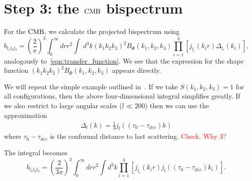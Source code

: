 \section{Step 3: the $\text{CMB}$ bispectrum}
    For the $\text{CMB}$, we calculate the projected bispectrum using~\cite{FergShell_2}
    \begin{equation}
    \label{eq:reduced_cmb}
    b_{l_1l_2l_3} = \left(\frac{2}{\pi}\right)^3\int_{0}^{\infty}drr^2
        \int~d^3k (k_1k_2k_3)^2 B_{\Phi}(k_1,k_2,k_3)\prod_{i=1}^{3}\left[j_{l_i}(k_ir)\Delta_{l_i}(k_i)\right],
    \end{equation}
    analogously to~\eqref{eqn:transfer_function}.
    We see that the expression for the shape function $(k_1k_2k_3)^2 B_{\Phi}(k_1,k_2,k_3)$ appears directly.


    We will repeat the simple example outlined in~\cite{FergShell_2}. If we
    take $S(k_1,k_2,k_3)=1$ for all configurations, then the above four-dimensional integral
    simplifies greatly. If we also restrict to large angular scales ($l\ll200$)
    then we can use the approximation
    \begin{align}
        \Delta_l(k) = \frac{1}{3}j_l((\tau_0-\tau_{dec})k)
    \end{align}
    where $\tau_0-\tau_{dec}$ is the conformal distance to last scattering.
    \textcolor{red}{Check. Why $3$?}

    The integral becomes
    \begin{equation}
    \label{eq:reduced_cmb_constant}
    b_{l_1l_2l_3} = \left(\frac{2}{3\pi}\right)^3\int_{0}^{\infty}drr^2
        \int d^3k \prod_{i=1}^{3}\left[j_{l_i}(k_ir)j_l((\tau_0-\tau_{dec})k_i)\right].
    \end{equation}


